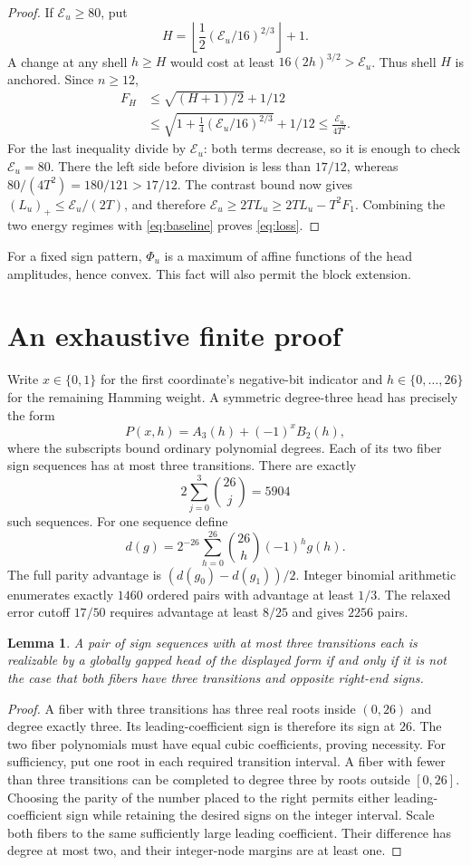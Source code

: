 \documentclass[11pt]{article}
\newtheorem{lemma}{Lemma}
\newcommand{\cost}{\mathcal E}
\begin{document}
\begin{proof}
If $\cost_u\ge80$, put
\[
 H=\left\lfloor\frac12(\cost_u/16)^{2/3}\right\rfloor+1.
\]
A change at any shell $h\ge H$ would cost at least $16(2h)^{3/2}>\cost_u$. Thus shell $H$ is anchored. Since $n\ge12$,
\begin{align*}
 F_H&\le\sqrt{(H+1)/2}+1/12\\
 &\le\sqrt{1+\tfrac14(\cost_u/16)^{2/3}}+1/12
 \le\frac{\cost_u}{4T^2}.
\end{align*}
For the last inequality divide by $\cost_u$: both terms decrease, so it is enough to check $\cost_u=80$. There the left side before division is less than $17/12$, whereas $80/(4T^2)=180/121>17/12$. The contrast bound now gives $(L_u)_+\le\cost_u/(2T)$, and therefore $\cost_u\ge2TL_u\ge2TL_u-T^2F_1$. Combining the two energy regimes with \eqref{eq:baseline} proves \eqref{eq:loss}.
\end{proof}

For a fixed sign pattern, $\Phi_u$ is a maximum of affine functions of the head amplitudes, hence convex. This fact will also permit the block extension.

\section{An exhaustive finite proof}
Write $x\in\{0,1\}$ for the first coordinate's negative-bit indicator and $h\in\{0,\ldots,26\}$ for the remaining Hamming weight. A symmetric degree-three head has precisely the form
\[
 P(x,h)=A_3(h)+(-1)^x B_2(h),
\]
where the subscripts bound ordinary polynomial degrees. Each of its two fiber sign sequences has at most three transitions. There are exactly
\[
 2\sum_{j=0}^3\binom{26}{j}=5904
\]
such sequences. For one sequence define
\[
 d(g)=2^{-26}\sum_{h=0}^{26}\binom{26}{h}(-1)^h g(h).
\]
The full parity advantage is $(d(g_0)-d(g_1))/2$. Integer binomial arithmetic enumerates exactly $1460$ ordered pairs with advantage at least $1/3$. The relaxed error cutoff $17/50$ requires advantage at least $8/25$ and gives $2256$ pairs.

\begin{lemma}\label{lem:feasible}
A pair of sign sequences with at most three transitions each is realizable by a globally gapped head of the displayed form if and only if it is not the case that both fibers have three transitions and opposite right-end signs.
\end{lemma}
\begin{proof}
A fiber with three transitions has three real roots inside $(0,26)$ and degree exactly three. Its leading-coefficient sign is therefore its sign at $26$. The two fiber polynomials must have equal cubic coefficients, proving necessity.
For sufficiency, put one root in each required transition interval. A fiber with fewer than three transitions can be completed to degree three by roots outside $[0,26]$. Choosing the parity of the number placed to the right permits either leading-coefficient sign while retaining the desired signs on the integer interval. Scale both fibers to the same sufficiently large leading coefficient. Their difference has degree at most two, and their integer-node margins are at least one.
\end{proof}
\end{document}
